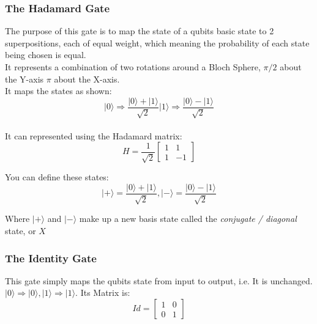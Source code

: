\documentclass[../main.tex]{subfiles}
\begin{document}
\subsubsection{The Hadamard Gate}

The purpose of this gate is to map the state of a qubits basic state to
2 superpositions, each of equal weight, which meaning the probability of
each state being chosen is equal.\\
It represents a combination of two rotations around a Bloch Sphere,
\(\pi /2\) about the Y-axis \(\pi\) about the X-axis.\\
It maps the states as shown:\\
\[
\lvert0\rangle \Rightarrow \frac{\lvert0\rangle + \lvert1\rangle}{ \sqrt{2}}                 \lvert1\rangle \Rightarrow \frac{\lvert0\rangle - \lvert1\rangle}{ \sqrt{2}}\]\\
It can represented using the Hadamard matrix:\\

\begin{equation}
	H = \frac{1}{\sqrt{2}} \left[ \begin{matrix} 1 & 1\\1 & -1\end{matrix} \right]
\end{equation}

You can define these states:\\

\begin{equation}
	\lvert+\rangle = \frac{\lvert0\rangle +\lvert1\rangle}{\sqrt{2}}, 
	\lvert-\rangle = \frac{\lvert0\rangle -\lvert1\rangle}{\sqrt{2}}
\end{equation}

Where \(\lvert+\rangle\) and \(\lvert-\rangle\) make up a new basis state called
the \emph{conjugate / diagonal} state, or \(X\)

\subsubsection{The Identity Gate}

This gate simply maps the qubits state from input to output, i.e. It is
unchanged. $|0\rangle \Rightarrow |0\rangle, |1\rangle \Rightarrow |1\rangle$. Its Matrix is:\\
\begin{equation}
	Id = \left[ \begin{matrix} 1 & 0\\0 & 1\end{matrix} \right]
\end{equation}
\end{document}
